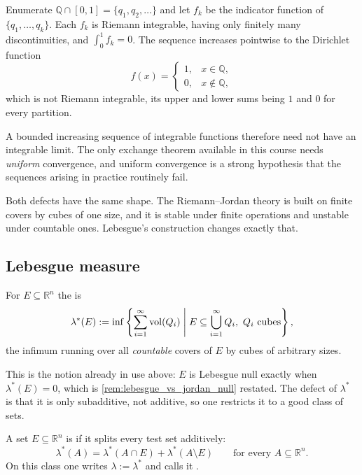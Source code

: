 \begin{example}
\label{ex:lebesgue_defect_limits}
Enumerate $\mathbb{Q}\cap[0,1] = \{q_1,q_2,\dots\}$ and let $f_k$ be the indicator function of
$\{q_1,\dots,q_k\}$. Each $f_k$ is Riemann integrable, having only finitely many discontinuities,
and $\int_0^1 f_k = 0$. The sequence increases pointwise to the Dirichlet function
\[f(x) = \begin{cases} 1, & x \in \mathbb{Q}, \\ 0, & x \notin \mathbb{Q},\end{cases}\]
which is not Riemann integrable, its upper and lower sums being $1$ and $0$ for every partition.

A bounded increasing sequence of integrable functions therefore need not have an integrable limit.
The only exchange theorem available in this course needs \emph{uniform} convergence, and uniform
convergence is a strong hypothesis that the sequences arising in practice routinely fail.
\end{example}

Both defects have the same shape. The Riemann--Jordan theory is built on finite covers by cubes of
one size, and it is stable under finite operations and unstable under countable ones. Lebesgue's
construction changes exactly that.

\subsection{Lebesgue measure}

\begin{definition}
\label{def:lebesgue_outer_measure}
For $E \subseteq \mathbb{R}^n$ the 
 is
\[\lambda^*(E) := \inf\left\{ \sum_{i=1}^\infty \operatorname{vol}(Q_i) \;\middle|\;
E \subseteq \bigcup_{i=1}^\infty Q_i,\ Q_i \text{ cubes} \right\},\]
the infimum running over all \emph{countable} covers of $E$ by cubes of arbitrary sizes.
\end{definition}

This is the notion already in use above: $E$ is Lebesgue null exactly when $\lambda^*(E) = 0$, which
is \cref{rem:lebesgue_vs_jordan_null} restated. The defect of $\lambda^*$ is that it is only
subadditive, not additive, so one restricts it to a good class of sets.

\begin{definition}
\label{def:lebesgue_measurable}
A set $E \subseteq \mathbb{R}^n$ is 
 if it splits every test set additively:
\[\lambda^*(A) = \lambda^*(A\cap E) + \lambda^*(A\setminus E) \qquad
\text{for every } A \subseteq \mathbb{R}^n.\]
On this class one writes $\lambda := \lambda^*$ and calls it 
.
\end{definition}

